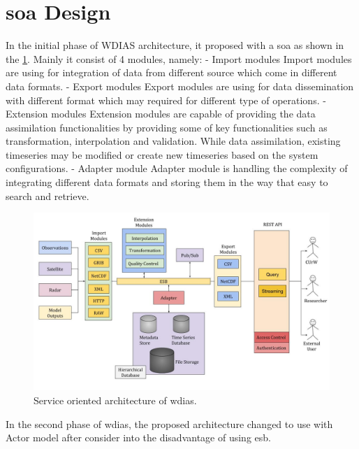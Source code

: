 \section{\acrfull{soa} Design}

In the initial phase of WDIAS architecture, it proposed with a \acrfull{soa} as shown in the \ref{fi:proposed_soa_arch_design}. Mainly it consist of 4 modules, namely:
- Import modules
Import modules are using for integration of data from different source which come in different data formats.
- Export modules
Export modules are using for data dissemination with different format which may required for different type of operations.
- Extension modules
Extension modules are capable of providing the data assimilation functionalities by providing some of key functionalities such as transformation, interpolation and validation. While data assimilation, existing timeseries may be modified or create new timeseries based on the system configurations.
- Adapter module
Adapter module is handling the complexity of integrating different data formats and storing them in the way that easy to search and retrieve.

\begin{figure}[htp]
    \centering
    \includegraphics[width=1\textwidth]{method/soa/soa_v1.jpg}
    \caption{Service oriented architecture of \acrshort{wdias}.}
    \label{fi:proposed_soa_arch_design}
\end{figure}

In the second phase of \acrshort{wdias}, the proposed architecture changed to use with Actor model after consider into the disadvantage of using \acrshort{esb}.

